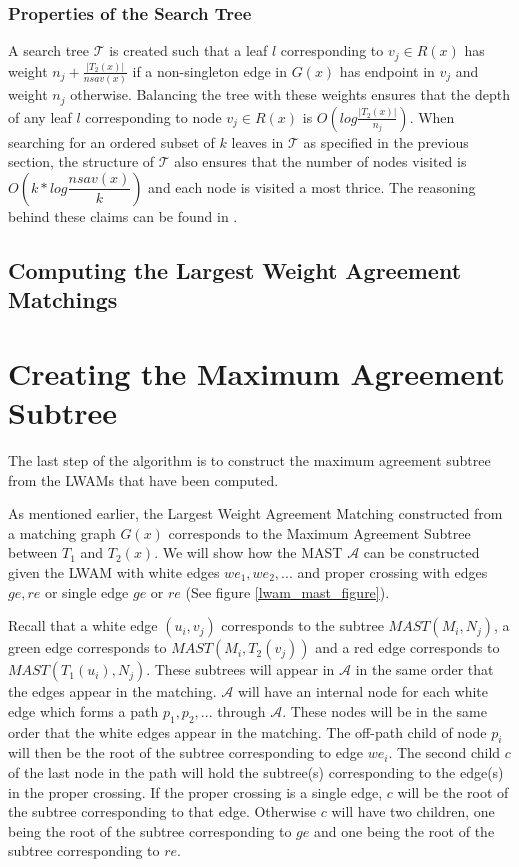 \subsubsection{Properties of the Search Tree}
\label{stProperties}
A search tree $\mathcal{T}$ is created such that a leaf $l$ corresponding to $v_j \in R(x)$ has weight $n_j + \frac{|T_2(x)|}{nsav(x)}$ if a non-singleton edge in $G(x)$ has endpoint in $v_j$ and weight $n_j$ otherwise. Balancing the tree with these weights ensures that the depth of any leaf $l$ corresponding to node $v_j \in R(x)$ is $O(log\frac{|T_2(x)|}{n_j})$. When searching for an ordered subset of $k$ leaves in $\mathcal{T}$ as specified in the previous section, the structure of $\mathcal{T}$ also ensures that the number of nodes visited is $O(k*log \dfrac{nsav(x)}{k})$ and each node is visited a most thrice. The reasoning behind these claims can be found in \cite{nlogn}.

\subsection{Computing the Largest Weight Agreement Matchings}


\section{Creating the Maximum Agreement Subtree}
The last step of the algorithm is to construct the maximum agreement subtree from the LWAMs that have been computed.

As mentioned earlier, the Largest Weight Agreement Matching constructed from a matching graph $G(x)$ corresponds to the Maximum Agreement Subtree between $T_1$ and $T_2(x)$. We will show how the MAST $\mathcal{A}$ can be constructed given the LWAM with white edges ${we_1, we_2, ...}$ and proper crossing with edges ${ge, re}$ or single edge $ge$ or $re$ (See figure \ref{lwam_mast_figure}).

Recall that a white edge $(u_i, v_j)$ corresponds to the subtree $MAST(M_i,N_j)$, a green edge corresponds to $MAST(M_i,T_2(v_j))$ and a red edge corresponds to $MAST(T_1(u_i),N_j)$. These subtrees will appear in $\mathcal{A}$ in the same order that the edges appear in the matching. $\mathcal{A}$ will have an internal node for each white edge which forms a path ${p_1, p_2, ...}$ through $\mathcal{A}$. These nodes will be in the same order that the white edges appear in the matching. The off-path child of node $p_i$ will then be the root of the subtree corresponding to edge $we_i$. The second child $c$ of the last node in the path will hold the subtree(s) corresponding to the edge(s) in the proper crossing. If the proper crossing is a single edge, $c$ will be the root of the subtree corresponding to that edge. Otherwise $c$ will have two children, one being the root of the subtree corresponding to $ge$ and one being the root of the subtree corresponding to $re$.

